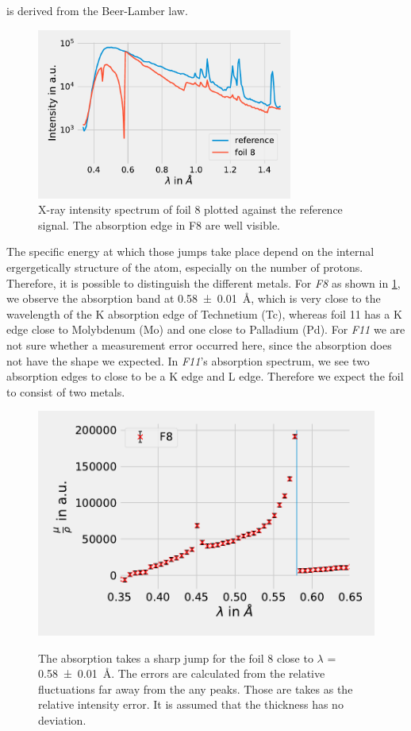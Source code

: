 is derived from the Beer-Lamber law.
\begin{figure}[ht]
    \centering
    \includegraphics[width = 0.75\textwidth]{Programming/Absorption/absorptionskanteFit.pdf}
    \caption[short]{X-ray intensity spectrum  of foil 8 plotted against the reference signal. The absorption edge in F8 are well visible.}
    \label{fig:IntF8ref}
\end{figure}
The specific energy at which those jumps take place depend on the internal ergergetically structure of 
the atom, especially on the number of protons. Therefore, it is possible to distinguish the different metals. For \textit{F8} as shown in \ref{fig:IntF8ref}, we observe the absorption band at 
\SI{0.58\pm0.01}{\AA}, which is very close to the wavelength of the K absorption edge of Technetium (Tc), whereas foil 11 has a K edge close to Molybdenum (Mo) and one close to Palladium (Pd). For \textit{F11} we are not sure whether a
measurement error occurred here, since the absorption does not have the shape we expected. In \textit{F11}'s absorption spectrum, we see two absorption edges to close to be a K edge and L edge. Therefore we expect the foil to consist of two metals.

\begin{figure}[h]
    \centering
    \includegraphics[width = 12cm]{Programming/Absorption/F8Kedge.pdf}
    \label{fig:F8edge}
    \caption{The absorption takes a sharp jump for the foil 8 close to $\lambda$ = \SI{0.58\pm0.01}{\AA}. The errors are calculated from the  relative fluctuations far away from the any peaks. Those are takes as the relative intensity error. It is assumed that the thickness has no deviation.}
\end{figure}


